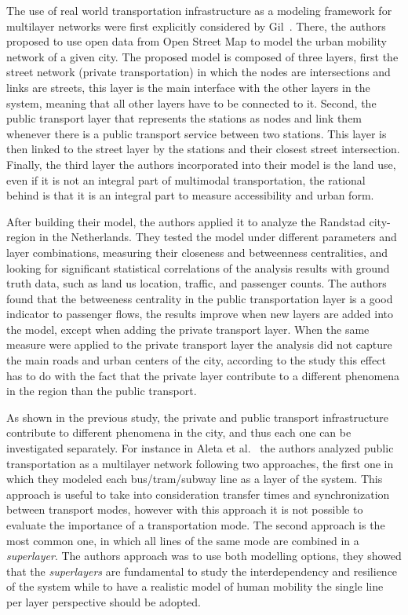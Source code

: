 The use of real world transportation infrastructure as a modeling framework for multilayer networks were first explicitly considered  by Gil~\cite{gil2014configuration}. There, the authors proposed to use open data from Open Street Map to model the urban mobility network of a given city. The proposed model is composed of three layers, first the street network (private transportation) in which the nodes are intersections and links are streets, this layer is the main interface with the other layers in the system, meaning that all other layers have to be connected to it. Second, the public transport layer that represents the stations as nodes and link them whenever there is a public transport service between two stations. This layer is then linked to the street layer by the stations and their closest street intersection. Finally, the third layer the authors incorporated into their model is the land use, even if it is not an integral part of multimodal transportation, the rational behind is that it is an integral part to measure accessibility and urban form.

After building their model, the authors applied it to analyze the Randstad city-region in the Netherlands. They tested the model under different parameters and layer combinations, measuring their closeness and betweenness centralities, and looking for significant statistical correlations of the analysis results with ground truth data, such as land us location, traffic, and passenger counts. The authors found that the betweeness centrality in the public transportation layer is a good indicator to passenger flows, the results improve when new layers are added into the model, except when adding the private transport layer. When the same measure were applied to the private transport layer the analysis did not capture the main roads and urban centers of the city, according to the study this effect has to do with the fact that the private layer contribute to a different phenomena in the region than the public transport.

As shown in the previous study, the private and public transport infrastructure contribute to different phenomena in the city, and thus each one can be investigated separately. For instance in Aleta et al.~\cite{Aleta2017Multilayer} the authors analyzed public transportation as a multilayer network following two approaches, the first one in which they modeled each bus/tram/subway line as a layer of the system. This approach is useful to take into consideration transfer times and synchronization between transport modes, however with this approach it is not possible to evaluate the importance of a transportation mode. The second approach is the most common one, in which all lines of the same mode are combined in a \textit{superlayer}. The authors approach was to use both modelling options, they showed that the \textit{superlayers} are fundamental to study the interdependency and resilience of the system while to have a realistic model of human mobility the single line per layer perspective should be adopted.

